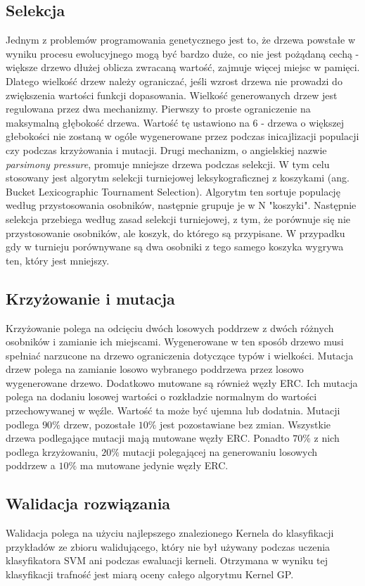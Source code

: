 \documentclass{article}
\begin{document}
\subsection{Selekcja}
Jednym z problemów programowania genetycznego jest to, że drzewa powstałe w wyniku procesu ewolucyjnego mogą być bardzo duże, co nie jest pożądaną cechą - większe drzewo dłużej oblicza zwracaną wartość, zajmuje więcej miejsc w pamięci. Dlatego wielkość drzew należy ograniczać, jeśli wzrost drzewa nie prowadzi do zwiększenia wartości funkcji dopasowania.
Wielkość generowanych drzew jest regulowana przez dwa mechanizmy. Pierwszy to proste ograniczenie na maksymalną głębokość drzewa. Wartość tę ustawiono na 6 - drzewa o większej głebokości nie zostaną w ogóle wygenerowane przez podczas inicajlizacji populacji czy podczas krzyżowania i mutacji. Drugi mechanizm, o angielskiej nazwie \textit{parsimony pressure},  promuje mniejsze drzewa podczas selekcji. W tym celu stosowany jest algorytm selekcji turniejowej leksykograficznej z koszykami (ang. Bucket Lexicographic
 Tournament Selection). Algorytm ten sortuje populację według przystosowania osobników, następnie grupuje je w N "koszyki". Następnie selekcja przebiega według zasad selekcji turniejowej, z tym, że porównuje się nie przystosowanie osobników, ale koszyk, do którego są przypisane. W przypadku gdy w turnieju porównywane są dwa osobniki z tego samego koszyka wygrywa ten, który jest mniejszy.

\subsection{Krzyżowanie i mutacja}
Krzyżowanie polega na odcięciu dwóch losowych poddrzew z dwóch różnych osobników i zamianie ich miejscami. Wygenerowane w ten sposób drzewo musi spełniać narzucone na drzewo ograniczenia dotyczące typów i wielkości.
Mutacja drzew polega na zamianie losowo wybranego poddrzewa przez losowo wygenerowane drzewo.
Dodatkowo mutowane są również węzły ERC. Ich mutacja polega na dodaniu losowej wartości o rozkładzie normalnym do wartości przechowywanej w węźle. Wartość ta może być ujemna lub dodatnia.
Mutacji podlega $ 90\% $ drzew, pozostałe $ 10\% $ jest pozostawiane bez zmian. Wszystkie drzewa podlegające mutacji mają mutowane węzły ERC. Ponadto $ 70\% $ z nich podlega krzyżowaniu, $ 20\% $ mutacji polegającej na generowaniu losowych poddrzew a $ 10\% $ ma mutowane jedynie węzły ERC.

\subsection{Walidacja rozwiązania}
Walidacja polega na użyciu najlepszego znalezionego Kernela do klasyfikacji przykładów ze zbioru walidującego, który nie był używany podczas uczenia klasyfikatora SVM ani podczas ewaluacji kerneli. Otrzymana w wyniku tej klasyfikacji trafność jest miarą oceny całego algorytmu Kernel GP.
\end{document}
